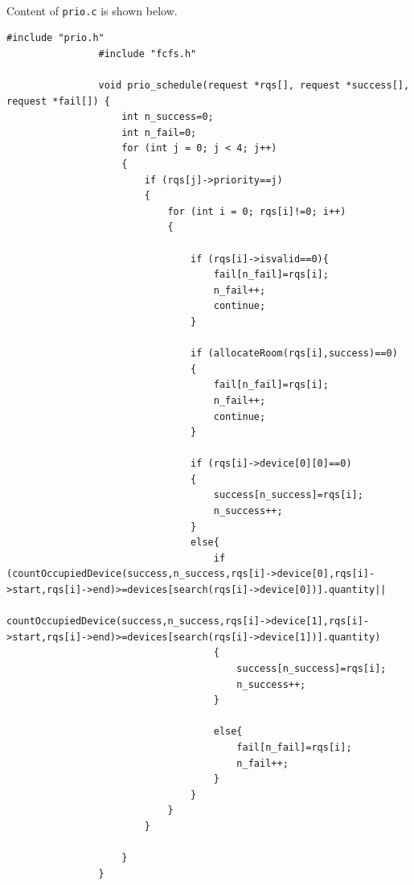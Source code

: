 \documentclass{article}
\begin{document}
            \paragraph{}
                Content of \texttt{prio.c} is shown below.
            \begin{Verbatim}[gobble=8]
                #include "prio.h"
                #include "fcfs.h"
                
                void prio_schedule(request *rqs[], request *success[], request *fail[]) {
                    int n_success=0;
                    int n_fail=0;
                    for (int j = 0; j < 4; j++)
                    {
                        if (rqs[j]->priority==j)
                        {
                            for (int i = 0; rqs[i]!=0; i++)
                            {
                
                                if (rqs[i]->isvalid==0){
                                    fail[n_fail]=rqs[i];
                                    n_fail++;
                                    continue;
                                }
                
                                if (allocateRoom(rqs[i],success)==0)
                                {
                                    fail[n_fail]=rqs[i];
                                    n_fail++;
                                    continue;
                                }
                
                                if (rqs[i]->device[0][0]==0)
                                {
                                    success[n_success]=rqs[i];
                                    n_success++;
                                }
                                else{
                                    if (countOccupiedDevice(success,n_success,rqs[i]->device[0],rqs[i]->start,rqs[i]->end)>=devices[search(rqs[i]->device[0])].quantity||
                                    countOccupiedDevice(success,n_success,rqs[i]->device[1],rqs[i]->start,rqs[i]->end)>=devices[search(rqs[i]->device[1])].quantity)
                                    {
                                        success[n_success]=rqs[i];
                                        n_success++;
                                    }
                
                                    else{
                                        fail[n_fail]=rqs[i];
                                        n_fail++;
                                    } 
                                }
                            }
                        }
                        
                    }
                }
            \end{Verbatim}
\end{document}
